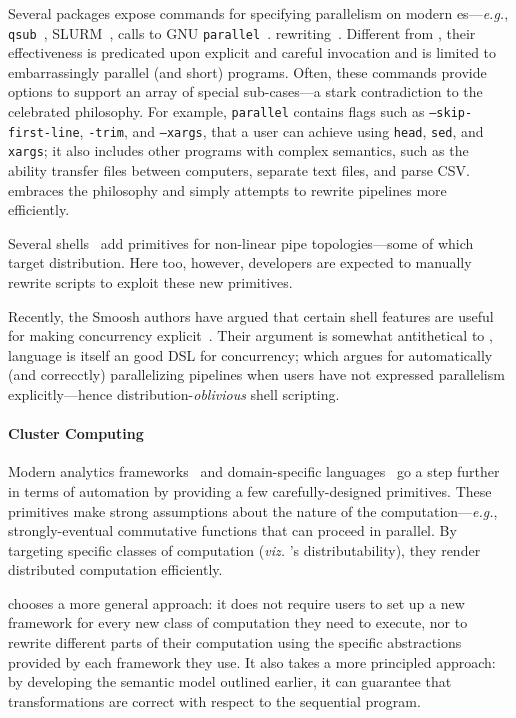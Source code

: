 \documentclass[sigplan,10pt,review,anonymous]{acmart}
\newcommand{\eg}{{\em e.g.}, }
\newcommand{\ttt}[1]{\texttt{\small #1}}
\begin{document}
Several packages expose commands for specifying parallelism on modern
\unix{}es---\eg \ttt{qsub}~\cite{gentzsch2001sun},
\textsc{SLURM}~\cite{yoo2003slurm}, calls to \textsc{GNU}
\ttt{parallel}~\cite{Tange2011a}. %
rewriting~\cite{mapreduce:08, ciel:11, spark:12}.  Different from
\sys, their effectiveness is predicated upon explicit and careful
invocation and is limited to embarrassingly parallel (and short)
programs.  Often, these commands provide options to support an array
of special sub-cases---a stark contradiction to the celebrated \unix
philosophy.  For example, \ttt{parallel} contains flags such as
\ttt{--skip-first-line}, \ttt{-trim}, and \ttt{--xargs}, that a \unix
user can achieve using \ttt{head}, \ttt{sed}, and \ttt{xargs}; it also
includes other programs with complex semantics, such as the ability
transfer files between computers, separate text files, and parse CSV.
\sys embraces the \unix philosophy and simply attempts to rewrite
pipelines more efficiently.

Several shells~\cite{duff1990rc, mcdonald1988support, dagsh:17} add
primitives for non-linear pipe topologies---some of which target
distribution.  Here too, however, developers are expected to manually
rewrite scripts to exploit these new primitives.

Recently, the Smoosh authors have argued that certain shell features
are useful for making concurrency explicit~\cite{smoosh:18}.  Their
argument is somewhat antithetical to \sys, %
language is itself an good DSL for concurrency; which argues for
automatically (and correcctly) parallelizing pipelines when users have
not expressed parallelism explicitly---hence
distribution-\emph{oblivious} shell scripting.


\paragraph{Cluster Computing}
Modern analytics frameworks~\cite{mapreduce:08, ciel:11, spark:12,
  naiad:13} and domain-specific languages~\cite{alvaro2011consistency,
  distal:13, meiklejohn2015lasp} go a step further in terms of
automation by providing a few carefully-designed primitives.  These
primitives make strong assumptions about the nature of the
computation---\eg strongly-eventual commutative functions that can
proceed in parallel.  By targeting specific classes of computation
(\emph{viz.} \sys's distributability), they render distributed
computation efficiently.

\sys chooses a more general approach: it does not require users to set
up a new framework for every new class of computation they need to
execute, nor to rewrite different parts of their computation using the
specific abstractions provided by each framework they use.  It also
takes a more principled approach: by developing the semantic model
outlined earlier, it can guarantee that transformations are correct
with respect to the sequential program.
\end{document}
